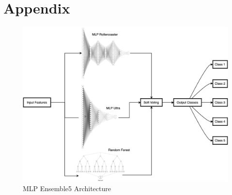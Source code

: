 \section{Appendix}



\begin{figure}[H]
    \centering
    \includegraphics[width=1\columnwidth]{./images/MLP_Ensemble5.png}
    \caption{MLP Ensemble5 Architecture}
    \label{fig:MLP_Ensemble5}
\end{figure}